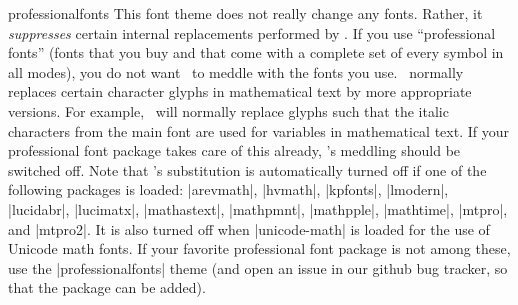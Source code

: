 \begin{fontthemeexample*}{professionalfonts}
  This font theme does not really change any fonts. Rather, it \emph{suppresses} certain internal replacements performed by \beamer. If you use ``professional fonts'' (fonts that you buy and that come with a complete set of every symbol in all modes), you do not want \beamer\ to meddle with the fonts you use. \beamer\ normally replaces certain character glyphs in mathematical text by more appropriate versions. For example, \beamer\ will normally replace glyphs such that the italic characters from the main font are used for variables in mathematical text. If your professional font package takes care of this already, \beamer's meddling should be switched off. Note that \beamer's substitution is automatically turned off if one of the following packages is loaded: |arevmath|, |hvmath|, |kpfonts|, |lmodern|, |lucidabr|, |lucimatx|, |mathastext|, |mathpmnt|, |mathpple|, |mathtime|, |mtpro|, and |mtpro2|. It is also turned off when |unicode-math| is loaded for the use of Unicode math fonts. If your favorite professional font package is not among these, use the |professionalfonts| theme (and open an issue in our github bug tracker, so that the package can be added).
\end{fontthemeexample*}

